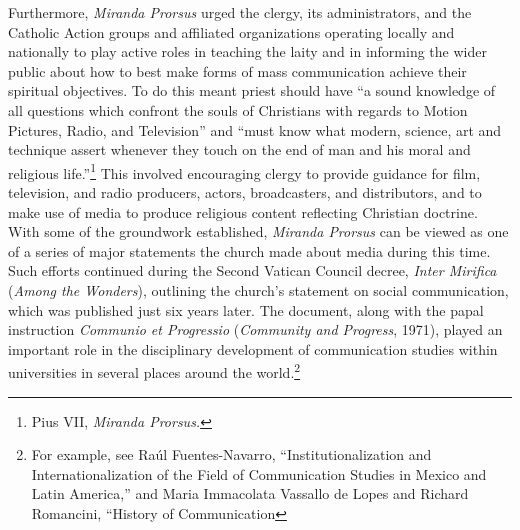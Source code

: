 \documentclass{tufte-handout}
\begin{document}
Furthermore, \emph{Miranda Prorsus} urged the clergy, its
administrators, and the Catholic Action groups and affiliated
organizations operating locally and nationally to play active roles in
teaching the laity and in informing the wider public about how to best
make forms of mass communication achieve their spiritual objectives. To
do this meant priest should have ``a sound knowledge of all questions
which confront the souls of Christians with regards to Motion Pictures,
Radio, and Television'' and ``must know what modern, science, art and
technique assert whenever they touch on the end of man and his moral and
religious life.''\footnote{Pius VII, \emph{Miranda Prorsus.}} This
involved encouraging clergy to provide guidance for film, television,
and radio producers, actors, broadcasters, and distributors, and to make
use of media to produce religious content reflecting Christian doctrine.
With some of the groundwork established, \emph{Miranda Prorsus} can be
viewed as one of a series of major statements the church made about
media during this time. Such efforts continued during the Second Vatican
Council decree, \emph{Inter Mirifica} (\emph{Among the Wonders}),
outlining the church's statement on social communication, which was
published just six years later. The document, along with the papal
instruction \emph{Communio et Progressio} (\emph{Community and
Progress}, 1971), played an important role in the disciplinary
development of communication studies within universities in several
places around the world.\footnote{For example, see Raúl Fuentes-Navarro,
  ``Institutionalization and Internationalization of the Field of
  Communication Studies in Mexico and Latin America,'' and Maria
  Immacolata Vassallo de Lopes and Richard Romancini, ``History of
  Communication}
\end{document}

